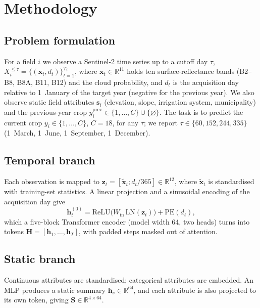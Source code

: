 \section{Methodology}

\subsection{Problem formulation}
For a field $i$ we observe a Sentinel-2 time series up to a cutoff day $\tau$,
$X_i^{\le\tau} = \{(\mathbf{x}_{t}, d_{t})\}_{t=1}^{T_i}$, where $\mathbf{x}_t \in \mathbb{R}^{11}$ holds ten
surface-reflectance bands (B2--B8, B8A, B11, B12) and the cloud probability, and $d_t$ is the acquisition day
relative to 1~January of the target year (negative for the previous year). We also observe static field
attributes $\mathbf{s}_i$ (elevation, slope, irrigation system, municipality) and the previous-year crop
$y_i^{\text{prev}} \in \{1,\dots,C\} \cup \{\varnothing\}$. The task is to predict the current crop
$y_i \in \{1,\dots,C\}$, $C = 18$, for any $\tau$; we report $\tau \in \{60, 152, 244, 335\}$
(1~March, 1~June, 1~September, 1~December).

\subsection{Temporal branch}
Each observation is mapped to $\mathbf{z}_t = [\tilde{\mathbf{x}}_t ; d_t/365] \in \mathbb{R}^{12}$, where
$\tilde{\mathbf{x}}_t$ is standardised with training-set statistics. A linear projection and a sinusoidal
encoding of the acquisition day give
\begin{equation}
  \mathbf{h}^{(0)}_t = \mathrm{ReLU}\big(W_{\text{in}}\,\mathrm{LN}(\mathbf{z}_t)\big) + \mathrm{PE}(d_t),
\end{equation}
which a five-block Transformer encoder (model width 64, two heads) turns into tokens
$\mathbf{H} = [\mathbf{h}_1, \dots, \mathbf{h}_T]$, with padded steps masked out of attention.

\subsection{Static branch}
Continuous attributes are standardised; categorical attributes are embedded. An MLP produces a static
summary $\mathbf{h}_s \in \mathbb{R}^{64}$, and each attribute is also projected to its own token, giving
$\mathbf{S} \in \mathbb{R}^{4 \times 64}$.

